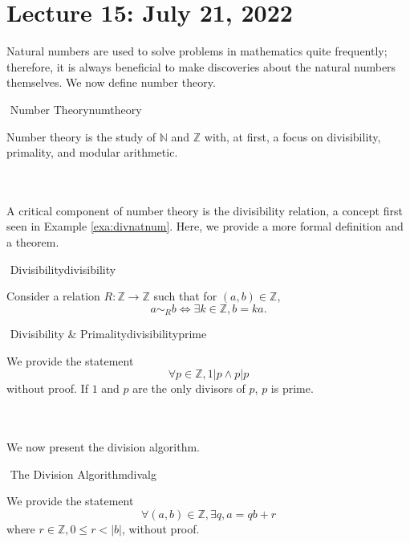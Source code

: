 \section{Lecture 15: July 21, 2022}

    Natural numbers are used to solve problems in mathematics quite frequently; therefore, it is always beneficial to make discoveries about the natural numbers themselves. We now define number theory.
    
    \begin{definition}{\Stop\,\,Number Theory}{numtheory}
    
        Number theory is the study of \(\mathbb{N}\) and \(\mathbb{Z}\) with, at first, a focus on divisibility, primality, and modular arithmetic.
    
    \end{definition}
    \vphantom
    \\
    \\
    A critical component of number theory is the divisibility relation, a concept first seen in Example \ref{exa:divnatnum}. Here, we provide a more formal definition and a theorem.
    \begin{definition}{\Stop\,\,Divisibility}{divisibility}
    
        Consider a relation \(R:\mathbb{Z}\to\mathbb{Z}\) such that for \((a,b)\in\mathbb{Z}\),
        \begin{equation*}
            a\sim_Rb\iff\exists k\in\mathbb{Z},b=ka.
        \end{equation*}
    
    \end{definition}
    \begin{theorem}{\Stop\,\,Divisibility \& Primality}{divisibilityprime}
    
        We provide the statement
        \begin{equation*}
            \forall p\in\mathbb{Z},1|p\wedge p|p
        \end{equation*}
        without proof. If \(1\) and \(p\) are the only divisors of \(p\), \(p\) is prime.
        
    \end{theorem}
    \pagebreak
    \vphantom
    \\
    \\
    We now present the division algorithm.
    \begin{theorem}{\Stop\,\,The Division Algorithm}{divalg}
    
        We provide the statement
        \begin{equation*}
            \forall(a,b)\in\mathbb{Z},\exists q,a=qb+r
        \end{equation*}
        where \(r\in\mathbb{Z},0\leq r<|b|\), without proof.
    
    \end{theorem}

